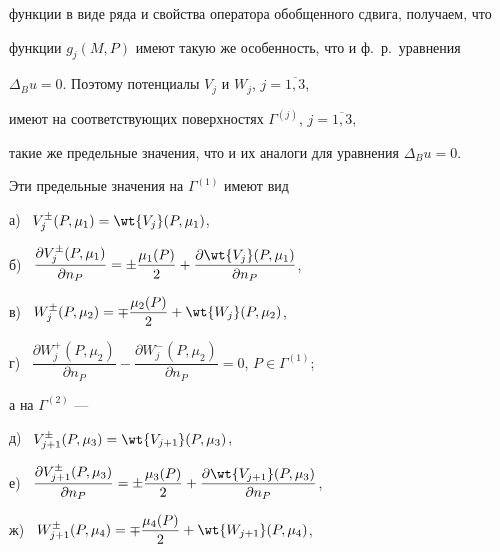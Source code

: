 функции в виде ряда и свойства оператора обобщенного сдвига, получаем, что 


функции $g_j(M,P)$ имеют такую же особенность, что и ф.~р.\ уравнения 


$\Delta_B u=0$. Поэтому потенциалы $V_j$ и $W_j$, $j=\overline{1,3}$, 


имеют на соответствующих поверхностях $\Gamma^{(j)}$, $j=\overline{1,3}$, 


такие же предельные значения, что и их аналоги для уравнения $\Delta_B u=0$. 


Эти предельные значения на $\Gamma^{(1)}$ имеют вид





а) \ $V_j^{\pm}(P, \mu_1)=\wt{V_j}(P, \mu_1)$,





б) \ $\dfrac{\partial V_j^{\pm}(P, \mu_1)}{\partial n_P}


=\pm\dfrac{\mu_1(P)}{2}+


\dfrac{\partial \wt{V_j}(P, \mu_1)}{\partial n_P}$,





в) \ $W_j^{\pm}(P, \mu_2)=\mp\dfrac{\mu_2(P)}{2}+\wt{W_j}(P, \mu_2)$,





г) \ $\dfrac{\partial W_j^{+}(P, \mu_2)}{\partial n_P}-


\dfrac{\partial W_j^{-}(P, \mu_2)}{\partial n_P}=0$, $P\in\Gamma^{(1)}$;





\noindent{}а на $\Gamma^{(2)}$ ---





д) \ $V_{j+1}^{\pm}(P, \mu_3)=\wt{V_{j+1}}(P, \mu_3)$,





е) \ $\dfrac{\partial V_{j+1}^{\pm}(P, \mu_3)}{\partial n_P}=


\pm\dfrac{\mu_3(P)}{2}+


\dfrac{\partial \wt{V_{j+1}}(P, \mu_3)}{\partial n_P}$,





ж) \ $W_{j+1}^{\pm}(P, \mu_4)=


\mp\dfrac{\mu_4(P)}{2}+\wt{W_{j+1}}(P, \mu_4)$,





